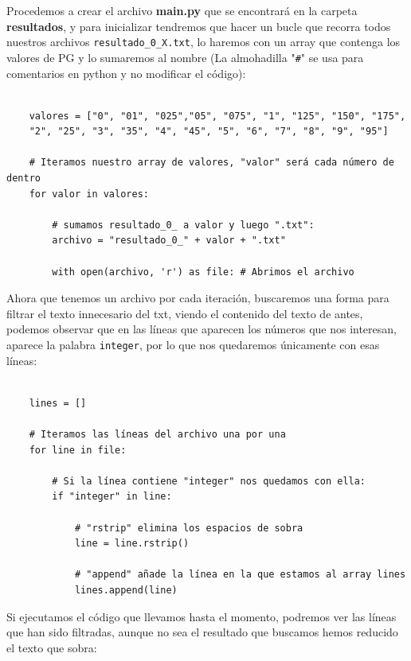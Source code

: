 \documentclass{article}
\begin{document}
Procedemos a crear el archivo \textbf{main.py} que se encontrará en la carpeta \textbf{resultados}, y para inicializar tendremos que hacer un bucle que recorra todos nuestros archivos \verb|resultado_0_X.txt|, lo haremos con un array que contenga los valores de PG y lo sumaremos al nombre (La almohadilla "\verb|#|" se usa para comentarios en python y no modificar el código):

\quad 
\begin{center} 
    \begin{verbatim}

    valores = ["0", "01", "025","05", "075", "1", "125", "150", "175",
    "2", "25", "3", "35", "4", "45", "5", "6", "7", "8", "9", "95"]

    # Iteramos nuestro array de valores, "valor" será cada número de dentro
    for valor in valores:

        # sumamos resultado_0_ a valor y luego ".txt":
        archivo = "resultado_0_" + valor + ".txt"

        with open(archivo, 'r') as file: # Abrimos el archivo

    \end{verbatim}
    \end{center} 
\quad

Ahora que tenemos un archivo por cada iteración, buscaremos una forma para filtrar el texto innecesario del txt, viendo el contenido del texto de antes, podemos observar que en las líneas que aparecen los números que nos interesan, aparece la palabra \verb|integer|, por lo que nos quedaremos únicamente con esas líneas:

\begin{center} 
    \begin{verbatim}

    lines = []

    # Iteramos las líneas del archivo una por una
    for line in file:

        # Si la línea contiene "integer" nos quedamos con ella:
        if "integer" in line:

            # "rstrip" elimina los espacios de sobra
            line = line.rstrip()

            # "append" añade la línea en la que estamos al array lines
            lines.append(line)

    \end{verbatim}
    \end{center} 

Si ejecutamos el código que llevamos hasta el momento, podremos ver las líneas que han sido filtradas, aunque no sea el resultado que buscamos hemos reducido el texto que sobra:
\end{document}

